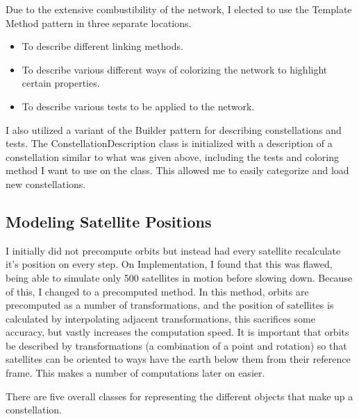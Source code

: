 \documentclass[12pt]{report}
\begin{document}
Due to the extensive combustibility of the network, I elected to use the Template Method pattern in three separate locations.

\begin{itemize}
\item To describe different linking methods.
\item To describe various different ways of colorizing the network to highlight certain properties.
\item To describe various tests to be applied to the network.
\end{itemize}

I also utilized a variant of the Builder pattern for describing constellations and tests. The ConstellationDescription class is initialized with a description of a constellation similar to what was given above, including the tests and coloring method I want to use on the class. This allowed me to easily categorize and load new constellations.


\subsection{Modeling Satellite Positions}
I initially did not precompute orbits but instead had every satellite recalculate it's position on every step. On Implementation, I found that this was flawed, being able to simulate only 500 satellites in motion before slowing down. Because of this, I changed to a precomputed method. In this method, orbits are precomputed as a number of transformations, and the position of satellites is calculated by interpolating adjacent transformations, this sacrifices some accuracy, but vastly increases the computation speed. It is important that orbits be described by transformations (a combination of a point and rotation) so that satellites can be oriented to ways have the earth below them from their reference frame. This makes a number of computations later on easier.

There are five overall classes for representing the different objects that make up a constellation.
\end{document}
